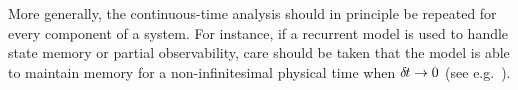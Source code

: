More generally, the continuous-time analysis should in principle be repeated for every component of  
a system. For instance, if a recurrent model is used to handle state
memory or partial observability, care should be taken that the model is
able to maintain memory for a non-infinitesimal physical time when
${\delta\hspace{-.1em}t}\to 0$ (see e.g.~\citealt{chronornn}).
